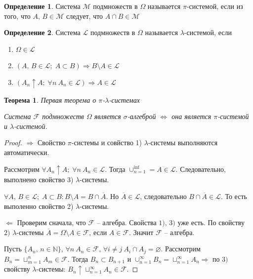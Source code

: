 \documentclass[a4paper,12pt]{article}
\renewcommand{\emptyset}{\ensuremath{\varnothing}}
\theoremstyle{plain}
\newtheorem{theorem}{Теорема}[section]
\theoremstyle{definition}
\newtheorem{definition}{Определение}[section]
\theoremstyle{remark}
\begin{document}
\begin{definition}
	Система $\mathcal{M}$ подмножеств в $\Omega$ называется $\pi$-системой, если из того, что $A,\, B \in \mathcal{M}$ следует, что $A \cap B \in \mathcal{M}$
\end{definition}

\begin{definition}
	Система $\mathcal{L}$ подмножеств в $\Omega$ называется $\lambda$-системой, если
	\begin{enumerate}
		\item $\Omega \in \mathcal{L}$
		\item $(A,\, B \in \mathcal{L};\; A \subset B) \Rightarrow B \setminus A \in \mathcal{L}$
		\item $(A_n \uparrow A;\; \forall n \: A_n \in \mathcal{L}) \Rightarrow A \in \mathcal{L}$
	\end{enumerate}
\end{definition}

\begin{theorem} \label{FIRST_SYSTEM_TH}
	Первая теорема о $\pi$-$\lambda$-системах

	Система $\mathcal{F}$ подмножеств $\Omega$ является $\sigma$-алгеброй $\Leftrightarrow$ она является $\pi$-системой и $\lambda$-системой.
\end{theorem}

\begin{proof}
	$\Rightarrow$ Свойство $\pi$-системы и совйство 1) $\lambda$-системы выполняются автоматически.

	Рассмотрим $\forall A_n \uparrow A;\; \forall n \: A_n \in \mathcal{L}$. Тогда $\cup_{n = 1}^{\inf} = A \in \mathcal{L}$. Следовательно, выполнено свойство 3) $\lambda$-системы.

	$\forall A,\, B \in \mathcal{L};\; A \subset B : B \setminus A = B \cap \overline{A}$. Но $\overline{A} \in \mathcal{L}$, следовательно $B \cap \overline{A} \in \mathcal{L}$.
	То есть выполенно свойство 2) $\lambda$-системы.

	$\Leftarrow$ Проверим сначала, что $\mathcal{F}$ -- алгебра. Свойства $1),\,3)$ уже есть. По свойству $2)$ $\lambda$-системы $\overline{A} = \Omega \setminus A \in \mathcal{F}$, если $A \in \mathcal{F}$. Значит $\mathcal{F}$ -- алгебра.

	Пусть $\{A_n,\, n \in \mathbb{N}\},\, \forall n \: A_n \in \mathcal{F},\, \forall i \neq j \: A_i \cap A_j = \emptyset$. Рассмотрим $B_n = \sqcup_{m = 1}^n A_m \in \mathcal{F}$. Тогда $B_n \subset B_{n + 1}$ и $\cup_{n = 1}^\infty B_n = \sqcup_{n = 1}^\infty A_n \Rightarrow$ по $3)$ свойству $\lambda$-системы: $B_n \uparrow \sqcup_{n = 1}^\infty A_n \in \mathcal{F}$.
\end{proof}
\end{document}
